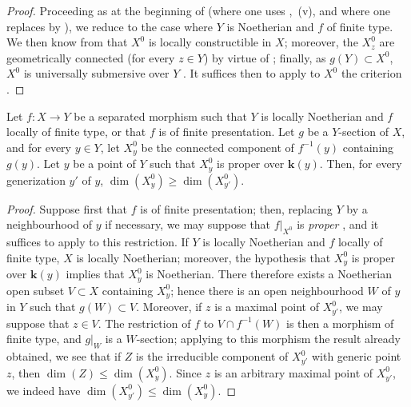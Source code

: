 \begin{proof}
Proceeding as at the beginning of  (where one uses ,~(v), and where one replaces  by ), we reduce to the case where $Y$ is Noetherian and $f$ of finite type. We then know from  that $X^0$ is locally constructible in $X$; moreover, the $X_z^0$ are geometrically connected (for every $z\in Y$) by virtue of ; finally, as $g(Y)\subset X^0$, $X^0$ is universally submersive over $Y$ .
It suffices then to apply to $X^0$ the criterion .
\end{proof}

\begin{corollary}[15.6.9]
\label{IV.15.6.9}
Let $f:X\to Y$ be a separated morphism such that $Y$ is locally Noetherian and $f$ locally of finite type, \textup{or} that $f$ is of finite presentation.
Let $g$ be a $Y$-section of $X$, and for every $y\in Y$, let $X_y^0$ be the connected component of $f^{-1}(y)$ containing $g(y)$.
Let $y$ be a point of $Y$ such that $X_y^0$ is proper over $\boldsymbol{k}(y)$.
Then, for every generization $y'$ of $y$, $\dim(X_y^0)\geq\dim(X_{y'}^0)$.
\end{corollary}

\begin{proof}
Suppose first that $f$ is of finite presentation; then, replacing $Y$ by a neighbourhood of $y$ if necessary, we may suppose that $f|_{X^0}$ is \emph{proper} , and it suffices to apply  to this restriction.
If $Y$ is locally Noetherian and $f$ locally of finite type, $X$ is locally Noetherian; moreover, the hypothesis that $X_y^0$ is proper over $\boldsymbol{k}(y)$ implies that $X_y^0$ is Noetherian. There therefore exists a Noetherian open subset $V\subset X$ containing $X_y^0$; hence there is an open neighbourhood $W$ of $y$ in $Y$ such that $g(W)\subset V$.
Moreover, if $z$ is a maximal point of $X_{y'}^0$, we may suppose that $z\in V$. The restriction of $f$ to $V\cap f^{-1}(W)$ is then a morphism of finite type, and $g|_W$ is a $W$-section; applying to this morphism the result already obtained, we see that if $Z$ is the irreducible component of $X_{y'}^0$ with generic point $z$, then $\dim(Z)\leq\dim(X_y^0)$. Since $z$ is an arbitrary maximal point of $X_{y'}^0$, we indeed have $\dim(X_{y'}^0)\leq\dim(X_y^0)$.
\end{proof}

